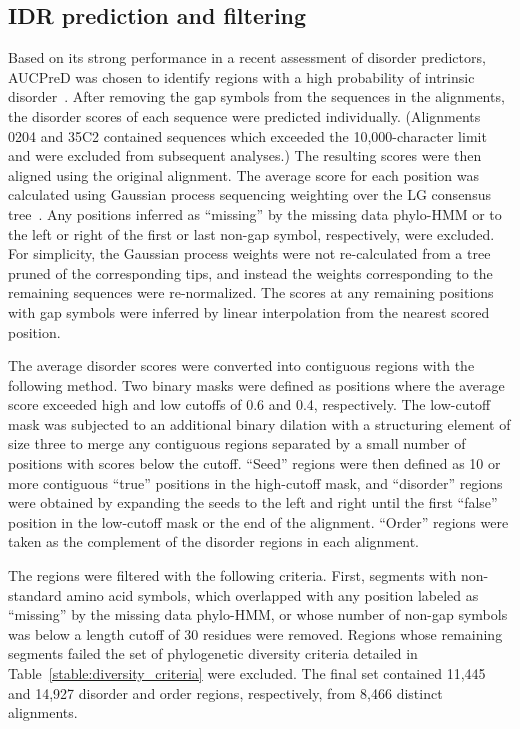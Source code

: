 \subsection{IDR prediction and filtering}
Based on its strong performance in a recent assessment of disorder predictors, AUCPreD was chosen to identify regions with a high probability of intrinsic disorder~\cite{Wang2016, Necci2021}. After removing the gap symbols from the sequences in the alignments, the disorder scores of each sequence were predicted individually. (Alignments 0204 and 35C2 contained sequences which exceeded the 10,000-character limit and were excluded from subsequent analyses.) The resulting scores were then aligned using the original alignment. The average score for each position was calculated using Gaussian process sequencing weighting over the LG consensus tree~\cite{Altschul1989}. Any positions inferred as ``missing'' by the missing data phylo-HMM or to the left or right of the first or last non-gap symbol, respectively, were excluded. For simplicity, the Gaussian process weights were not re-calculated from a tree pruned of the corresponding tips, and instead the weights corresponding to the remaining sequences were re-normalized. The scores at any remaining positions with gap symbols were inferred by linear interpolation from the nearest scored position.

The average disorder scores were converted into contiguous regions with the following method. Two binary masks were defined as positions where the average score exceeded high and low cutoffs of 0.6 and 0.4, respectively. The low-cutoff mask was subjected to an additional binary dilation with a structuring element of size three to merge any contiguous regions separated by a small number of positions with scores below the cutoff. ``Seed'' regions were then defined as 10 or more contiguous ``true'' positions in the high-cutoff mask, and ``disorder'' regions were obtained by expanding the seeds to the left and right until the first ``false'' position in the low-cutoff mask or the end of the alignment. ``Order'' regions were taken as the complement of the disorder regions in each alignment.

The regions were filtered with the following criteria. First, segments with non-standard amino acid symbols, which overlapped with any position labeled as ``missing'' by the missing data phylo-HMM, or whose number of non-gap symbols was below a length cutoff of 30 residues were removed. Regions whose remaining segments failed the set of phylogenetic diversity criteria detailed in Table~\ref{stable:diversity_criteria} were excluded. The final set contained 11,445 and 14,927 disorder and order regions, respectively, from 8,466 distinct alignments.

